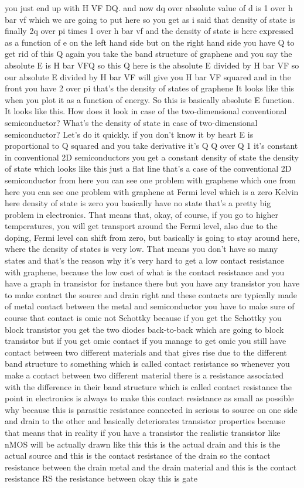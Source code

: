 you just end up with H VF DQ. and now dq over absolute value of d is 1 over h bar vf which we are going to put here so you get as i said that density of state is finally 2q over pi times 1 over h bar vf and the density of state is here expressed as a function of e on the left hand side but on the right hand side you have Q to get rid of this Q again you take the band structure of graphene and you say the absolute E is H bar VFQ so this Q here is the absolute E divided by H bar VF so our absolute E divided by H bar VF will give you H bar VF squared and in the front you have 2 over pi that's the density of states of graphene It looks like this when you plot it as a function of energy. So this is basically absolute E function. It looks like this. How does it look in case of the two-dimensional conventional semiconductor? What's the density of state in case of two-dimensional semiconductor? Let's do it quickly. if you don't know it by heart E is proportional to Q squared and you take derivative it's Q Q over Q 1 it's constant in conventional 2D semiconductors you get a constant density of state the density of state which looks like this just a flat line that's a case of the conventional 2D semiconductor from here you can see one problem with graphene which one from here you can see one problem with graphene at Fermi level which is a zero Kelvin here density of state is zero you basically have no state that's a pretty big problem in electronics. That means that, okay, of course, if you go to higher temperatures, you will get transport around the Fermi level, also due to the doping, Fermi level can shift from zero, but basically is going to stay around here, where the density of states is very low. That means you don't have so many states and that's the reason why it's very hard to get a low contact resistance with graphene, because the low cost of what is the contact resistance and you have a graph in transistor for instance there but you have any transistor you have to make contact the source and drain right and these contacts are typically made of metal contact between the metal and semiconductor you have to make sure of course that contact is omic not Schottky because if you get the Schottky you block transistor you get the two diodes back-to-back which are going to block transistor but if you get omic contact if you manage to get omic you still have contact between two different materials and that gives rise due to the different band structure to something which is called contact resistance so whenever you make a contact between two different material there is a resistance associated with the difference in their band structure which is called contact resistance the point in electronics is always to make this contact resistance as small as possible why because this is parasitic resistance connected in serious to source on one side and drain to the other and basically deteriorates transistor properties because that means that in reality if you have a transistor the realistic transistor like nMOS will be actually drawn like this this is the actual drain and this is the actual source and this is the contact resistance of the drain so the contact resistance between the drain metal and the drain material and this is the contact resistance RS the resistance between okay this is gate 
